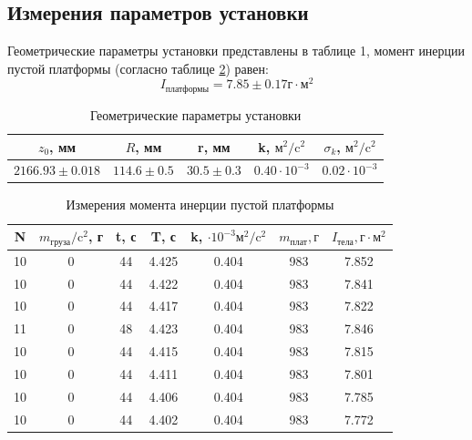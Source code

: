 \documentclass[a4, 12pt]{article}
\begin{document}
\subsection{Измерения параметров установки}
Геометрические параметры установки представлены в таблице 1, момент инерции пустой платформы (согласно таблице \ref{пустая}) равен:
\begin{equation}
I_{\text{платформы}} = 7.85 \pm 0.17 \text{г}\cdot \text{м}^2
\end{equation}
\begin{table} \label{геом} \caption{Геометрические параметры установки}
\begin{tabular}{|c|c|c|c|c|}
\hline 
$z_0$, мм& $R$, мм & r, мм & k, $\text{м}^2/\text{c}^2$ & $\sigma_k$, $\text{м}^2/\text{c}^2$ \\ 
\hline 
$2166.93 \pm 0.018$ & $114.6 \pm 0.5$ & $30.5 \pm 0.3$ & $0.40 \cdot 10^{-3}$ & $0.02 \cdot 10^{-3}$ \\ 
\hline 
\end{tabular} 
\end{table}


\begin{table} \label{пустая} \caption{Измерения момента инерции пустой платформы} \begin{tabular}{|c|c|c|c|c|c|c|} \hline N & $m_\text{груза}/\text{c}^2$, г & t, с & T, с & k, $\cdot 10^{-3}\text{м}^2/\text{c}^2$ & $m_\text{плат}, г$& $I_\text{тела}, \text{г}\cdot \text{м}^2$ \\ \hline 10 & 0 & 44 & 4.425 & 0.404 & 983 & 7.852 \\ \hline 10 & 0 & 44 & 4.422 & 0.404 & 983 & 7.841 \\ \hline 10 & 0 & 44 & 4.417 & 0.404 & 983 & 7.822 \\ \hline 11 & 0 & 48 & 4.423 & 0.404 & 983 & 7.846 \\ \hline 10 & 0 & 44 & 4.415 & 0.404 & 983 & 7.815 \\ \hline 10 & 0 & 44 & 4.411 & 0.404 & 983 & 7.801 \\ \hline 10 & 0 & 44 & 4.406 & 0.404 & 983 & 7.785 \\ \hline 10 & 0 & 44 & 4.402 & 0.404 & 983 & 7.772 \\ \hline \end{tabular} \end{table}
\end{document}
